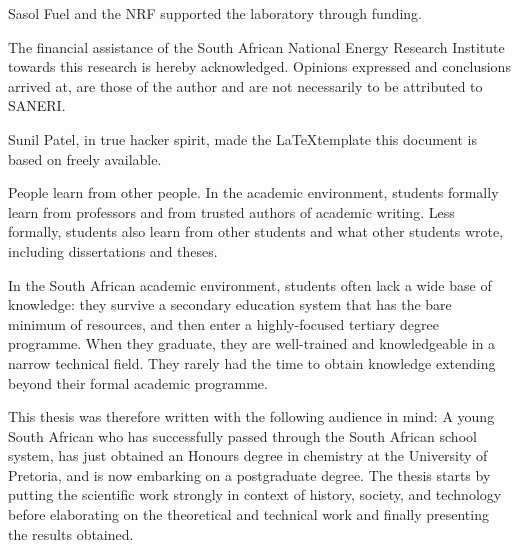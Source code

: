 \documentclass[
11pt, %
english, %
singlespacing, %
headsepline, %
]{MastersDoctoralThesis} %
\begin{document}
\begin{acknowledgements}
Sasol Fuel and the NRF supported the laboratory through funding.

The financial assistance of the South African National Energy Research Institute
towards this research is hereby acknowledged. Opinions expressed and conclusions
arrived at, are those of the author and are not necessarily to be attributed to
SANERI.

Sunil Patel, in true hacker spirit, made the \LaTeX template this document is
based on freely available.


\end{acknowledgements}


\begin{preface}
\addchaptertocentry{\prefacename}

People learn from other people. In the academic environment, students formally
learn from professors and from trusted authors of academic writing. Less
formally, students also learn from other students and what other students
wrote, including dissertations and theses.

In the South African academic environment, students often lack a wide base of
knowledge: they survive a secondary education system that has the bare minimum
of resources, and then enter a highly-focused tertiary degree programme. When
they graduate, they are well-trained and knowledgeable in a narrow technical
field. They rarely had the time to obtain knowledge extending beyond their
formal academic programme.

This thesis was therefore written with the following audience in mind: A young
South African who has successfully passed through the South African school
system, has just obtained an Honours degree in chemistry at the University of
Pretoria, and is now embarking on a postgraduate degree. The thesis starts by
putting the scientific work strongly in context of history, society, and
technology before elaborating on the theoretical and technical work and finally
presenting the results obtained.

\end{preface}

\end{document}
